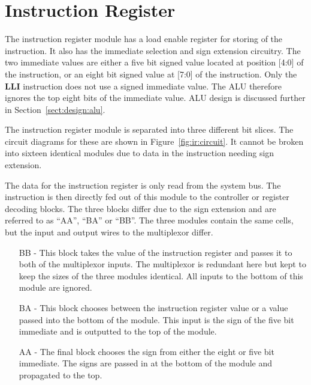 
\section{Instruction Register}


The instruction register module has a load enable register for storing of the instruction.
It also has the immediate selection and sign extension circuitry.
The two immediate values are either a five bit signed value located at position [4:0] of the instruction, or an eight bit signed value at [7:0] of the instruction.
Only the \textbf{LLI} instruction does not use a signed immediate value. 
The ALU therefore ignores the top eight bits of the immediate value. 
ALU design is discussed further in Section~\ref{sect:design:alu}.

The instruction register module is separated into three different bit slices.
The circuit diagrams for these are shown in Figure~\ref{fig:ir:circuit}.
It cannot be broken into sixteen identical modules due to data in the instruction needing sign extension. 

The data for the instruction register is only read from the system bus. 
The instruction is then directly fed out of this module to the controller or register decoding blocks.
The three blocks differ due to the sign extension and are referred to as ``AA'', ``BA'' or ``BB''.
The three modules contain the same cells, but the input and output wires to the multiplexor differ. 
\begin{enumerate}
\item[BB] - This block takes the value of the instruction register and passes it to both of the multiplexor inputs. The multiplexor is redundant here but kept to keep the sizes of the three modules identical. All inputs to the bottom of this module are ignored.
\item[BA] - This block chooses between the instruction register value or a value passed into the bottom of the module. This input is the sign of the five bit immediate and is outputted to the top of the module.
\item[AA] - The final block chooses the sign from either the eight or five bit immediate. The signs are passed in at the bottom of the module and propagated to the top. 
\end{enumerate}

